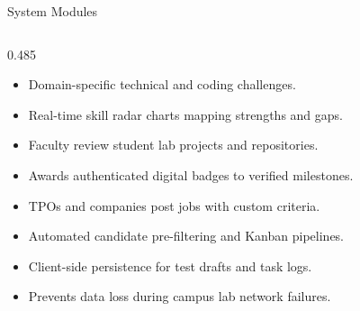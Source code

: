 \documentclass[aspectratio=169,10pt,xcolor={table,dvipsnames}]{beamer}
\begin{document}
\begin{frame}[t]{System Modules}
  \begin{columns}[T]
    \begin{column}{0.485\textwidth}
      \begin{tcolorbox}[modcard,title={1.\;Diagnostic Skill Assessment Module}]
        \fontsize{6.0}{7.0}\selectfont
        \begin{itemize}\setlength{\itemsep}{0pt}
          \item Domain-specific technical and coding challenges.
          \item Real-time skill radar charts mapping strengths and gaps.
        \end{itemize}
      \end{tcolorbox}\vspace{0.03cm}

      \begin{tcolorbox}[modcard,title={2.\;Faculty Milestone Verification Module}]
        \fontsize{6.0}{7.0}\selectfont
        \begin{itemize}\setlength{\itemsep}{0pt}
          \item Faculty review student lab projects and repositories.
          \item Awards authenticated digital badges to verified milestones.
        \end{itemize}
      \end{tcolorbox}\vspace{0.03cm}

      \begin{tcolorbox}[modcard,title={3.\;Placement \& Internship Drive Hub}]
        \fontsize{6.0}{7.0}\selectfont
        \begin{itemize}\setlength{\itemsep}{0pt}
          \item TPOs and companies post jobs with custom criteria.
          \item Automated candidate pre-filtering and Kanban pipelines.
        \end{itemize}
      \end{tcolorbox}\vspace{0.03cm}

      \begin{tcolorbox}[modcard,title={4.\;Offline-First IndexedDB Cache Layer}]
        \fontsize{6.0}{7.0}\selectfont
        \begin{itemize}\setlength{\itemsep}{0pt}
          \item Client-side persistence for test drafts and task logs.
          \item Prevents data loss during campus lab network failures.
        \end{itemize}
      \end{tcolorbox}
    \end{column}


\end{columns}
\end{frame}
\end{document}
